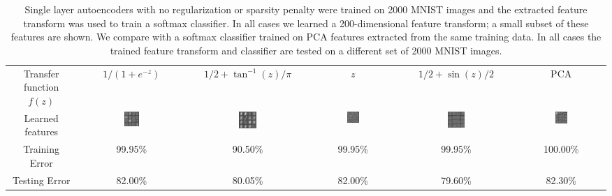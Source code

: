 \documentclass[twocolumn]{article}
\begin{document}
\begin{table}
  \centering
  \begin{tabular}{|C|CCCC|C|}
  \hline
  Transfer function $f(z)$ & $1/(1+e^{-z})$ & $1/2+\tan^{-1}(z)/\pi$ & $z$ & $1/2+\sin(z)/2$ & PCA \\
  Learned features
    & \includegraphics[width=0.15\textwidth]{aeFigs/sigmoid.png}
    & \includegraphics[width=0.15\textwidth]{aeFigs/atan.png}
    & \includegraphics[width=0.15\textwidth]{aeFigs/id.png}
    & \includegraphics[width=0.15\textwidth]{aeFigs/sin.png}
    & \includegraphics[width=0.15\textwidth]{aeFigs/pca.png} \\
  Training Error & 99.95\% & 90.50\% & 99.95\% & 99.95\% & 100.00\% \\
  Testing Error & 82.00\% & 80.05\% & 82.00\% & 79.60\% & 82.30\% \\
  \hline
  \end{tabular}
  \caption{Single layer autoencoders with no regularization or sparsity penalty were trained on
    2000 MNIST images and the extracted feature transform was used to train a softmax classifier.
    In all cases we learned a 200-dimensional feature transform; a small subset of these features
    are shown. We compare with a softmax classifier trained on PCA features extracted from the same
    training data. In all cases the trained feature transform and classifier are tested on a different
    set of 2000 MNIST images.}
  \label{table:noSparse}
\end{table}
\end{document}
